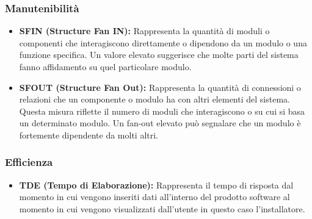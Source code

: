 \subsubsection{Manutenibilità}
\begin{itemize}
    \item \textbf{SFIN (Structure Fan IN):} Rappresenta la quantità di moduli o componenti che interagiscono direttamente o dipendono da un modulo o una funzione specifica. Un valore elevato suggerisce che molte parti del sistema fanno affidamento su quel particolare modulo.
    \item \textbf{SFOUT (Structure Fan Out):} Rappresenta la quantità di connessioni o relazioni che un componente o modulo ha con altri elementi del sistema. Questa misura riflette il numero di moduli che interagiscono o su cui si basa un determinato modulo. Un fan-out elevato può segnalare che un modulo è fortemente dipendente da molti altri.
\end{itemize}
\subsubsection{Efficienza}
\begin{itemize}
    \item \textbf{TDE (Tempo di Elaborazione):} Rappresenta il tempo di risposta dal momento in cui vengono inseriti dati all'interno del prodotto software al momento in cui vengono visualizzati dall'utente in questo caso l'installatore.
\end{itemize}
